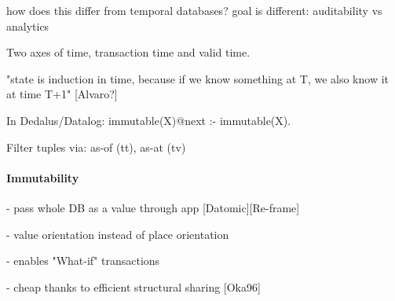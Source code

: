 how does this differ from temporal databases?
goal is different: auditability vs analytics

Two axes of time, transaction time and valid time. \cite{snodgrass1992temporal}

"state is induction in time, because if we know something at T, we also know it at time T+1" [Alvaro?]

In Dedalus/Datalog: immutable(X)@next :- immutable(X).

Filter tuples via: as-of (tt), as-at (tv)


\paragraph{Immutability}


- pass whole DB as a value through app [Datomic][Re-frame]

- value orientation instead of place orientation

- enables "What-if" transactions

- cheap thanks to efficient structural sharing [Oka96]
